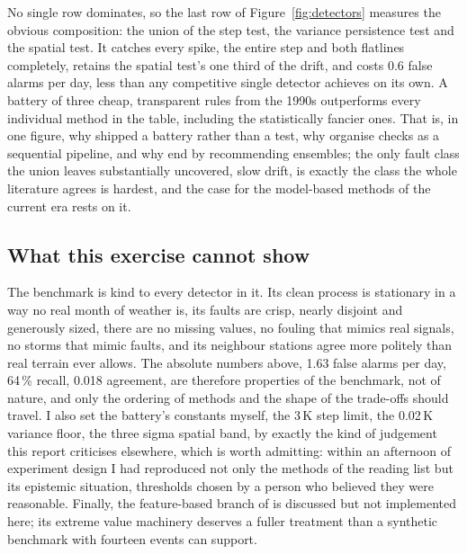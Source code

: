 No single row dominates, so the last row of Figure~\ref{fig:detectors}
measures the obvious composition: the union of the step test, the variance
persistence test and the spatial test. It catches every spike, the entire
step and both flatlines completely, retains the spatial test's one third of
the drift, and costs 0.6 false alarms per day, less than any competitive
single detector achieves on its own. A battery of three cheap, transparent
rules from the 1990s outperforms every individual method in the table,
including the statistically fancier ones. That is, in one figure, why
\citet{shafer2000} shipped a battery rather than a test, why
\citet{campbell2013} organise checks as a sequential pipeline, and why
\citet{leigh2019} end by recommending ensembles; the only fault class the
union leaves substantially uncovered, slow drift, is exactly the class the
whole literature agrees is hardest, and the case for the model-based methods
of the current era rests on it.

\subsection{What this exercise cannot show}
\label{sec:exp-limits}

The benchmark is kind to every detector in it. Its clean process is
stationary in a way no real month of weather is, its faults are crisp,
nearly disjoint and generously sized, there are no missing values, no fouling that
mimics real signals, no storms that mimic faults, and its neighbour stations
agree more politely than real terrain ever allows. The absolute numbers
above, 1.63 false alarms per day, 64\,\% recall, 0.018 agreement, are
therefore properties of the benchmark, not of nature, and only the ordering
of methods and the shape of the trade-offs should travel. I also set the
battery's constants myself, the 3\,K step limit, the 0.02\,K variance floor,
the three sigma spatial band, by exactly the kind of judgement this report
criticises elsewhere, which is worth admitting: within an afternoon of
experiment design I had reproduced not only the methods of the reading list
but its epistemic situation, thresholds chosen by a person who believed they
were reasonable. Finally, the feature-based branch of \citet{talagala2019}
is discussed but not implemented here; its extreme value machinery deserves
a fuller treatment than a synthetic benchmark with fourteen events can
support.
